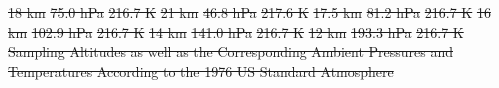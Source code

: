 \documentclass[a4paper,12pt,twoside]{article}
\providecommand{\DIFdeltex}[1]{{\protect\color{red}\sout{#1}}}                      %
\providecommand{\DIFdelbegin}{} %
\providecommand{\DIFdelFL}[1]{\DIFdel{#1}} %
\providecommand{\DIFdel}[1]{\texorpdfstring{\DIFdeltex{#1}}{}} %
\newcommand{\DIFscaledelfig}{0.5}
\newlength{\DIFdelgraphicswidth} %
\newlength{\DIFdelgraphicsheight} %
\newcommand{\DIFdelincludegraphics}[2][]{%
\sbox{\DIFdelgraphicsbox}{\DIFOincludegraphics[#1]{#2}}%
\settoboxwidth{\DIFdelgraphicswidth}{\DIFdelgraphicsbox} %
\settoboxtotalheight{\DIFdelgraphicsheight}{\DIFdelgraphicsbox} %
\scalebox{\DIFscaledelfig}{%
\parbox[b]{\DIFdelgraphicswidth}{\usebox{\DIFdelgraphicsbox}\\[-\baselineskip] \rule{\DIFdelgraphicswidth}{0em}}\llap{\resizebox{\DIFdelgraphicswidth}{\DIFdelgraphicsheight}{%
\setlength{\unitlength}{\DIFdelgraphicswidth}%
\begin{picture}(1,1)%
\thicklines\linethickness{2pt} %
{\color[rgb]{1,0,0}\put(0,0){\framebox(1,1){}}}%
{\color[rgb]{1,0,0}\put(0,0){\line( 1,1){1}}}%
{\color[rgb]{1,0,0}\put(0,1){\line(1,-1){1}}}%
\end{picture}%
}\hspace*{3pt}}} %
} %
\DeclareRobustCommand{\DIFdelbegin}{\DIFOdelbegin \let\includegraphics\DIFdelincludegraphics} %
\begin{document}
\DIFdelbegin %
\DIFdelFL{18 km }%
\DIFdelFL{75.0 hPa }%
\DIFdelFL{216.7 K }%
\DIFdelFL{21 km }%
\DIFdelFL{46.8 hPa }%
\DIFdelFL{217.6 K }%
\DIFdelFL{17.5 km }%
\DIFdelFL{81.2 hPa }%
\DIFdelFL{216.7 K }%
\DIFdelFL{16 km }%
\DIFdelFL{102.9 hPa }%
\DIFdelFL{216.7 K }%
\DIFdelFL{14 km }%
\DIFdelFL{141.0 hPa }%
\DIFdelFL{216.7 K }%
\DIFdelFL{12 km }%
\DIFdelFL{193.3 hPa }%
\DIFdelFL{216.7 K }%
{%
\DIFdelFL{Sampling Altitudes as well as the Corresponding Ambient Pressures and Temperatures According to the 1976 US Standard Atmosphere}}
\end{document}
